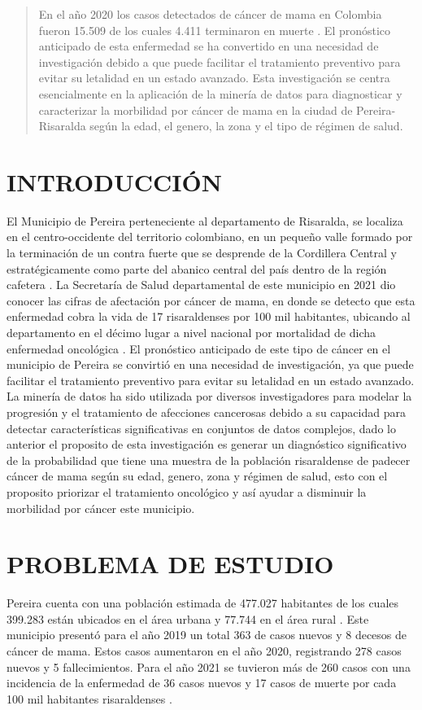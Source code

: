 \begin{abstract}
	En el año 2020 los casos detectados de cáncer de mama en Colombia fueron 15.509 de los cuales 4.411 terminaron en muerte \cite{InternationalAgencyforResearchonCancer2020}. El pronóstico anticipado de esta enfermedad se ha convertido en una necesidad de investigación debido a que puede facilitar el tratamiento preventivo para evitar su letalidad en un estado avanzado. Esta investigación se centra esencialmente en la aplicación de la minería de datos para diagnosticar y caracterizar la morbilidad por cáncer de mama  en la ciudad de Pereira-Risaralda según la edad, el genero, la zona y el tipo de régimen de salud.
\end{abstract}

\section{INTRODUCCIÓN }

El Municipio de Pereira perteneciente al departamento de Risaralda, se localiza en el centro-occidente del territorio colombiano, en un pequeño valle formado por la terminación de un contra fuerte que se desprende de la Cordillera Central y estratégicamente como parte del abanico central del país dentro de la región cafetera \cite{Pereira2002}. La Secretaría de Salud departamental de este municipio en 2021 dio conocer las cifras de afectación por cáncer de mama, en donde se detecto que esta enfermedad cobra la vida de 17 risaraldenses por 100 mil habitantes, ubicando al departamento en el décimo lugar a nivel nacional por mortalidad de dicha enfermedad oncológica \cite{Risaralda2021}. El pronóstico anticipado de este tipo de cáncer en el municipio de Pereira se convirtió en una necesidad de investigación, ya que puede facilitar el tratamiento preventivo para evitar su letalidad en un estado avanzado. La minería de datos ha sido utilizada por diversos investigadores para modelar la progresión y el tratamiento de afecciones cancerosas debido a su capacidad para detectar características significativas en conjuntos de datos complejos, dado lo anterior el proposito de esta investigación es generar un diagnóstico significativo de la probabilidad que tiene una muestra de la población risaraldense de padecer cáncer de mama según su edad, genero, zona  y régimen de salud, esto con el proposito priorizar el tratamiento oncológico y así ayudar a disminuir la morbilidad por cáncer este municipio.


\section{PROBLEMA DE ESTUDIO}
Pereira cuenta con una población estimada de 477.027 habitantes de los cuales 399.283 están ubicados en el área urbana y 77.744 en el área rural \cite{DANE2021}. Este municipio presentó para el año 2019 un total 363 de casos nuevos y 8 decesos de cáncer de mama. Estos casos aumentaron en el año 2020, registrando 278 casos nuevos y 5 fallecimientos. Para el año 2021 se tuvieron más de 260 casos con una incidencia de la enfermedad de 36 casos nuevos y 17 casos de muerte por cada 100 mil habitantes risaraldenses \cite{Risaralda2021}.


